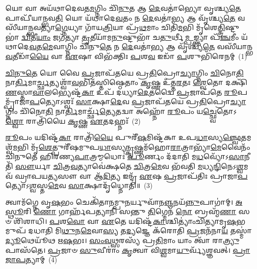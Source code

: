 \setcounter{anuvakam}{0}
𑌯𑍋 𑌵𑌾 𑌅𑌯᳴𑌥𑌾𑌦𑍇𑌵𑌤\-\ul{𑌮}\-𑌗𑍍𑌨𑌿𑌂 𑌚𑌿᳴\-\ul{𑌨𑍁}\-𑌤 𑌆 \ul{𑌦𑍇}\-𑌵𑌤𑌾॑𑌭𑍍𑌯𑍋 𑌵𑍃𑌶𑍍𑌚𑍍𑌯\-\ul{𑌤𑍇} 𑌪𑌾𑌪𑍀᳴𑌯𑌾𑌨𑍍𑌭𑌵\-\ul{𑌤𑌿} 𑌯𑍋 𑌯᳴𑌥𑌾𑌦𑍇\-\ul{𑌵}\-𑌤𑌂 𑌨 \ul{𑌦𑍇}\-𑌵𑌤𑌾॑\-\ul{𑌭𑍍𑌯} 𑌆 𑌵𑍃᳴𑌶𑍍𑌚𑍍𑌯\-\ul{𑌤𑍇} 𑌵𑌸𑍀᳴𑌯𑌾𑌨𑍍𑌭𑌵𑌤𑍍𑌯𑌾\-\ul{𑌗𑍍𑌨𑍇}\-𑌯𑍍𑌯𑌾 𑌗𑌾᳴𑌯\-\ul{𑌤𑍍𑌰𑌿}\-𑌯𑌾 𑌪𑍍𑌰᳴\-\ul{𑌥}\-𑌮𑌾𑌂 𑌚𑌿𑌤𑌿᳴\-\ul{𑌮}\-𑌭𑌿 𑌮𑍃᳴𑌶𑍇\-\ul{𑌤𑍍𑌤𑍍𑌰𑌿}\-𑌷𑍍𑌟𑍁𑌭𑌾॑ \ul{𑌦𑍍𑌵𑌿}\-𑌤𑍀\-\ul{𑌯𑌾𑌂} 𑌜𑌗᳴𑌤𑍍𑌯𑌾 \ul{𑌤𑍃}\-𑌤𑍀𑌯𑌾᳴𑌮\-\ul{𑌨𑍁}\-𑌷𑍍𑌟𑍁𑌭𑌾᳴ 𑌚\-\ul{𑌤𑍁}\-𑌰𑍍𑌥𑍀\-\ul{𑌮𑍍𑌪}\-𑌙𑍍𑌕𑍍𑌤𑍍𑌯𑌾 𑌪᳴\-\ul{𑌞𑍍𑌚}\-𑌮𑍀𑌂 𑌯᳴𑌥𑌾𑌦𑍇\-\ul{𑌵}\-𑌤\-\ul{𑌮𑍇}\-𑌵𑌾𑌗𑍍𑌨𑌿𑌂 𑌚𑌿᳴𑌨𑍁\-\ul{𑌤𑍇} 𑌨 \ul{𑌦𑍇}\-𑌵𑌤𑌾॑\-\ul{𑌭𑍍𑌯} 𑌆 𑌵𑍃᳴𑌶𑍍𑌚𑍍𑌯\-\ul{𑌤𑍇} 𑌵𑌸𑍀᳴𑌯𑌾𑌨𑍍𑌭\-\ul{𑌵}\-𑌤𑍀𑌡𑌾᳴\-\ul{𑌯𑍈} 𑌵𑌾 \ul{𑌏}\-𑌷𑌾 𑌵𑌿𑌭᳴𑌕𑍍𑌤𑌿𑌃 \ul{𑌪}\-𑌶\-\ul{𑌵} 𑌇𑌡𑌾᳴ \ul{𑌪}\-𑌶𑍁𑌭𑌿᳴𑌰𑍇𑌨𑌮𑍍~(1)

\-\ul{𑌚𑌿}\-\-\ul{𑌨𑍁}\-\-\ul{𑌤𑍇} 𑌯𑍋 𑌵𑍈 \ul{𑌪𑍍𑌰}\-𑌜𑌾𑌪᳴𑌤𑌯𑍇 𑌪𑍍𑌰\-\ul{𑌤𑌿}\-𑌪𑍍𑌰𑍋\-\ul{𑌚𑍍𑌯𑌾}\-𑌗𑍍𑌨𑌿𑌂 \ul{𑌚𑌿}\-𑌨𑍋\-\ul{𑌤𑌿} 𑌨𑌾\-\ul{𑌰𑍍𑌤𑌿}\-𑌮𑌾\-\ul{𑌰𑍍𑌚𑍍𑌛}\-𑌤𑍍𑌯𑌶𑍍𑌵𑌾᳴\-\ul{𑌵}\-𑌭𑌿𑌤᳴𑌸𑍍𑌤𑌿𑌷𑍍𑌠𑍇𑌤𑌾𑌂 \ul{𑌕𑍃}\-𑌷𑍍𑌣 𑌉᳴𑌤𑍍𑌤\-\ul{𑌰}\-𑌤𑌃 \ul{𑌶𑍍𑌵𑍇}\-𑌤𑍋 𑌦𑌕𑍍𑌷𑌿᳴\-\ul{𑌣}\-\-𑌸𑍍𑌤𑌾\-\ul{𑌵𑌾}\-𑌲𑌭𑍍𑌯𑍇𑌷𑍍𑌟᳴\-\ul{𑌕𑌾} 𑌉𑌪᳴ 𑌦𑌧𑍍𑌯𑌾\-\ul{𑌦𑍇}\-𑌤𑌦𑍍𑌵𑍈 \ul{𑌪𑍍𑌰}\-𑌜𑌾𑌪᳴𑌤𑍇 \ul{𑌰𑍂}\-𑌪𑌮𑍍𑌪𑍍𑌰𑌾᳴𑌜𑌾\-\ul{𑌪}\-𑌤𑍍𑌯𑍋\-𑌽𑌶𑍍𑌵𑌃᳴ \ul{𑌸𑌾}\-𑌕𑍍𑌷𑌾\-\ul{𑌦𑍇}\-𑌵 \ul{𑌪𑍍𑌰}\-𑌜𑌾𑌪᳴𑌤𑌯𑍇 𑌪𑍍𑌰\-\ul{𑌤𑌿}\-𑌪𑍍𑌰𑍋\-\ul{𑌚𑍍𑌯𑌾}\-𑌗𑍍𑌨𑌿𑌂 𑌚𑌿᳴𑌨𑍋\-\ul{𑌤𑌿} 𑌨𑌾\-\ul{𑌰𑍍𑌤𑌿}\-𑌮𑌾𑌰𑍍𑌚𑍍𑌛᳴\-\ul{𑌤𑍍𑌯𑍇}\-𑌤𑌦𑍍𑌵𑌾 𑌅𑌹𑍍𑌨𑍋᳴ \ul{𑌰𑍂}\-𑌪𑌂 𑌯\-\ul{𑌚𑍍𑌛𑍍𑌵𑍇}\-𑌤𑍋\-𑌽\-\ul{𑌶𑍍𑌵𑍋} 𑌰𑌾𑌤𑍍𑌰𑌿᳴𑌯𑍈 \ul{𑌕𑍃}\-𑌷𑍍𑌣 \ul{𑌏}\-𑌤𑌦𑌹𑍍𑌨𑌃᳴~(2)

\-\ul{𑌰𑍂}\-𑌪𑌂 𑌯𑌦𑌿𑌷𑍍𑌟᳴\-\ul{𑌕𑌾} 𑌰𑌾𑌤𑍍𑌰𑌿᳴\-\ul{𑌯𑍈} 𑌪𑍁𑌰𑍀᳴\-\ul{𑌷}\-𑌮𑌿𑌷𑍍𑌟᳴𑌕𑌾 𑌉𑌪\-\ul{𑌧𑌾}\-𑌸𑍍𑌯\-\ul{𑌞𑍍𑌛𑍍𑌵𑍇}\-𑌤𑌮𑌶𑍍𑌵᳴\-\ul{𑌮}\-𑌭𑌿 𑌮𑍃᳴\-\ul{𑌶𑍇}\-𑌤𑍍𑌪𑍁𑌰𑍀᳴𑌷𑌮𑍁𑌪\-\ul{𑌧𑌾}\-𑌸𑍍𑌯\-\ul{𑌨𑍍𑌕𑍃}\-𑌷𑍍𑌣𑌮᳴𑌹𑍋\-\ul{𑌰𑌾}\-𑌤𑍍𑌰𑌾𑌭𑍍𑌯𑌾᳴\-\ul{𑌮𑍇}\-𑌵𑍈𑌨𑌂᳴ 𑌚𑌿𑌨𑍁𑌤𑍇 𑌹𑌿𑌰𑌣𑍍𑌯\-\ul{𑌪𑌾}\-𑌤𑍍𑌰𑌮𑍍𑌮𑌧𑍋𑌃॑ \ul{𑌪𑍂}\-𑌰𑍍𑌣𑌂 𑌦᳴𑌦𑌾𑌤𑌿 𑌮\-\ul{𑌧}\-𑌵𑍍𑌯𑍋᳴\-𑌽\-\ul{𑌸𑌾}\-𑌨𑍀𑌤𑌿᳴ \ul{𑌸𑍗}\-𑌰𑍍𑌯𑌾 \ul{𑌚𑌿}\-𑌤𑍍𑌰\-\ul{𑌵}\-𑌤𑍍𑌯𑌾𑌵𑍇॑𑌕𑍍𑌷𑌤𑍇 \ul{𑌚𑌿}\-𑌤𑍍𑌰\-\ul{𑌮𑍇}\-𑌵 𑌭᳴𑌵𑌤𑌿 \ul{𑌮}\-𑌧𑍍𑌯\-\ul{𑌨𑍍𑌦𑌿}\-𑌨𑍇\-𑌽\-\ul{𑌶𑍍𑌵}\-𑌮𑌵᳴ 𑌘𑍍𑌰𑌾𑌪𑌯\-\ul{𑌤𑍍𑌯}\-𑌸𑍗 𑌵𑌾 𑌆᳴\-\ul{𑌦𑌿}\-𑌤𑍍𑌯 𑌇𑌨𑍍𑌦𑍍𑌰᳴ \ul{𑌏}\-𑌷 \ul{𑌪𑍍𑌰}\-𑌜𑌾𑌪᳴𑌤𑌿𑌃 𑌪𑍍𑌰𑌾𑌜𑌾\-\ul{𑌪}\-𑌤𑍍𑌯𑍋\-𑌽\-\ul{𑌶𑍍𑌵}\-𑌸𑍍𑌤\-\ul{𑌮𑍇}\-𑌵 \ul{𑌸𑌾}\-𑌕𑍍𑌷𑌾𑌦𑍃᳴𑌧𑍍𑌨𑍋𑌤𑌿॥~(3)

{\anuvakamend[{\-\ul{𑌏}\-𑌨\-\ul{𑌮𑍇}\-𑌤𑌦\-\ul{𑌹𑍍𑌨𑍋}\-\-𑌽𑌷𑍍𑌟𑌾𑌚᳴𑌤𑍍𑌵𑌾𑌰𑌿𑍞𑌶𑌚𑍍𑌚}]}%

𑌤𑍍𑌵𑌾𑌮᳴𑌗𑍍𑌨𑍇 𑌵𑍃\-\ul{𑌷}\-𑌭𑌂 𑌚𑍇𑌕𑌿᳴𑌤𑌾\-\ul{𑌨}\-𑌮𑍍𑌪𑍁\-\ul{𑌨}\-𑌰𑍍𑌯𑍁𑌵𑌾᳴𑌨\-\ul{𑌞𑍍𑌜}\-𑌨𑌯᳴\-\ul{𑌨𑍍𑌨𑍁}\-𑌪𑌾𑌗𑌾॑𑌮𑍍। \ul{𑌅}\-\-\ul{𑌸𑍍𑌥𑍂}\-𑌰𑌿 \ul{𑌣𑍋} 𑌗𑌾𑌰𑍍\mbox{}𑌹᳴𑌪𑌤𑍍𑌯𑌾𑌨𑌿 𑌸𑌨𑍍𑌤𑍁 \ul{𑌤𑌿}\-𑌗𑍍𑌮𑍇𑌨᳴ \ul{𑌨𑍋} 𑌬𑍍𑌰𑌹𑍍𑌮᳴\-\ul{𑌣𑌾} 𑌸𑍞 𑌶𑌿᳴𑌶𑌾𑌧𑌿। \ul{𑌪}\-𑌶\-\ul{𑌵𑍋} 𑌵𑌾 \ul{𑌏}\-𑌤𑍇 𑌯𑌦𑌿𑌷𑍍𑌟᳴\-\ul{𑌕𑌾}\-𑌶𑍍𑌚𑌿𑌤𑍍𑌯𑌾𑌂॑𑌚𑌿𑌤𑍍𑌯𑌾𑌮𑍃\-\ul{𑌷}\-𑌭𑌮𑍁𑌪᳴ 𑌦𑌧𑌾𑌤𑌿 𑌮𑌿\-\ul{𑌥𑍁}\-𑌨\-\ul{𑌮𑍇}\-𑌵𑌾\-\ul{𑌸𑍍𑌯} 𑌤\-\ul{𑌦𑍍𑌯}\-𑌜𑍍𑌞𑍇 𑌕᳴𑌰𑍋𑌤𑌿 \ul{𑌪𑍍𑌰}\-𑌜𑌨᳴𑌨𑌾\-\ul{𑌯} 𑌤𑌸𑍍𑌮𑌾॑\-\ul{𑌦𑍍𑌯𑍂}\-𑌥𑍇𑌯𑍂᳴𑌥 𑌋\-\ul{𑌷}\-𑌭𑌃। \ul{𑌸𑌂}\-\-\ul{𑌵}\-\-\ul{𑌥𑍍𑌸}\-𑌰𑌸𑍍𑌯᳴ 𑌪𑍍𑌰\-\ul{𑌤𑌿}\-𑌮𑌾𑌂 𑌯𑌾𑌂 𑌤𑍍𑌵𑌾᳴ 𑌰𑌾\-\ul{𑌤𑍍𑌰𑍍𑌯𑍁}\-𑌪𑌾𑌸᳴𑌤𑍇। \ul{𑌪𑍍𑌰}\-𑌜𑌾𑍞 \ul{𑌸𑍁}\-𑌵𑍀𑌰𑌾𑌂॑ \ul{𑌕𑍃}\-𑌤𑍍𑌵𑌾 𑌵𑌿\-\ul{𑌶𑍍𑌵}\-𑌮𑌾\-\ul{𑌯𑍁}\-𑌰𑍍𑌵𑍍𑌯᳴𑌶𑍍𑌞𑌵𑌤𑍍। \ul{𑌪𑍍𑌰𑌾}\-\-\ul{𑌜𑌾}\-\-\ul{𑌪}\-𑌤𑍍𑌯𑌾𑌮𑍍~(4)

